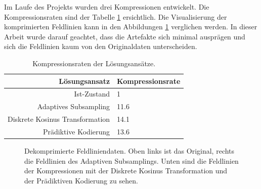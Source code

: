 Im Laufe des Projekts wurden drei Kompressionen entwickelt. Die Kompressionsraten sind der Tabelle \ref{einleitung:tabelle} ersichtlich. Die Visualisierung der komprimierten Feldlinien kann in den Abbildungen \ref{einleitung:artefakte} verglichen werden. In dieser Arbeit wurde darauf geachtet, dass die Artefakte sich minimal ausprägen und sich die Feldlinien kaum von den Originaldaten unterscheiden.
\begin{table}[!htbp]
	\center
	\begin{tabular}{r|l}
		Lösungsansatz & Kompressionsrate \\\hline
		Ist-Zustand & 1\\
		Adaptives Subsampling & 11.6 \\
		Diskrete Kosinus Transformation & 14.1 \\
		Prädiktive Kodierung & 13.6\\
	\end{tabular}
	\caption{Kompressionsraten der Lösungsansätze.}
	\label{einleitung:tabelle}
\end{table}
\begin{figure}[!htbp]
\center
{}
\caption{Dekomprimierte Feldliniendaten. Oben links ist das Original, rechts die Feldlinien des Adaptiven Subsamplings. Unten sind die Feldlinien der Kompressionen mit der Diskrete Kosinus Transformation und der Prädiktiven Kodierung zu sehen.}
\label{einleitung:artefakte}
\end{figure}
